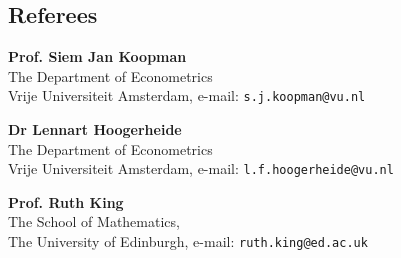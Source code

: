 \documentclass[margin,line]{resume}
\begin{document}
\begin{resume}
\section{\mysidestyle Referees} 

 \textbf{Prof. Siem Jan Koopman} \\    
 The Department of Econometrics \\
 Vrije Universiteit Amsterdam, e-mail: \texttt{s.j.koopman@vu.nl}

 \textbf{Dr Lennart Hoogerheide} \\  
 The Department of Econometrics \\  
 Vrije Universiteit Amsterdam, e-mail: \texttt{l.f.hoogerheide@vu.nl}

 \textbf{Prof. Ruth King} \\  
 The School of Mathematics,\\  
 The University of Edinburgh, e-mail: \texttt{ruth.king@ed.ac.uk}
 
\end{resume}
\end{document}
